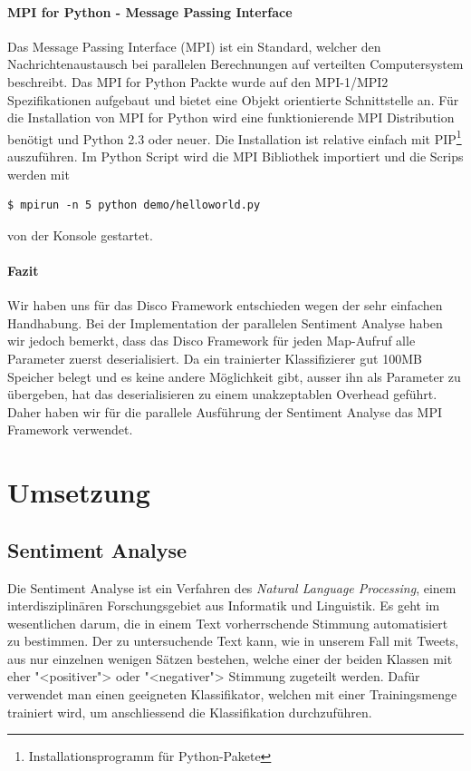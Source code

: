 \documentclass[12pt, oneside]{report}   	%
\begin{document}
\subsubsection{MPI for Python - Message Passing Interface}
Das Message Passing Interface (MPI) ist ein Standard, welcher den Nachrichtenaustausch bei parallelen Berechnungen auf verteilten Computersystem beschreibt. Das MPI for Python Packte wurde auf den MPI-1/MPI2 Spezifikationen aufgebaut und bietet eine Objekt orientierte Schnittstelle an. Für die Installation von MPI for Python wird eine funktionierende MPI Distribution benötigt und Python 2.3 oder neuer. Die Installation ist relative einfach mit PIP\footnote{Installationsprogramm für Python-Pakete} auszuführen. Im Python Script wird die MPI Bibliothek importiert und die Scrips werden mit
\begin{lstlisting}
$ mpirun -n 5 python demo/helloworld.py
\end{lstlisting}
von der Konsole gestartet.

\subsubsection{Fazit}
Wir haben uns für das Disco Framework entschieden wegen der sehr einfachen Handhabung.
Bei der Implementation der parallelen Sentiment Analyse haben wir jedoch bemerkt, dass das Disco Framework für jeden Map-Aufruf alle Parameter zuerst deserialisiert. 
Da ein trainierter Klassifizierer gut 100MB Speicher belegt und es keine andere Möglichkeit gibt, ausser ihn als Parameter zu übergeben, hat das deserialisieren zu einem unakzeptablen Overhead geführt. 
Daher haben wir für die parallele Ausführung der Sentiment Analyse das MPI Framework verwendet.





\chapter{Umsetzung}

\section{Sentiment Analyse}
Die Sentiment Analyse ist ein Verfahren des \emph{Natural Language Processing}, einem interdisziplinären Forschungsgebiet aus Informatik und Linguistik.
Es geht im wesentlichen darum, die in einem Text vorherrschende Stimmung automatisiert zu bestimmen. 
Der zu untersuchende Text kann, wie in unserem Fall mit Tweets, aus nur einzelnen wenigen Sätzen bestehen, welche einer der beiden Klassen mit eher "<positiver"> oder "<negativer"> Stimmung zugeteilt werden.
Dafür verwendet man einen geeigneten Klassifikator, welchen  mit einer Trainingsmenge trainiert wird, um anschliessend die Klassifikation durchzuführen. 
\end{document}
